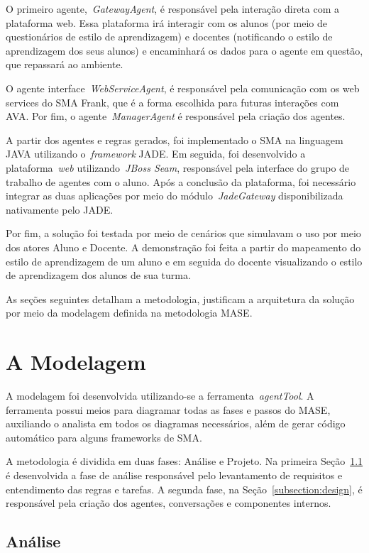 O primeiro agente,~\emph{GatewayAgent}, é responsável pela interação direta com a plataforma web. Essa plataforma irá interagir com os alunos (por meio de questionários de estilo de aprendizagem) e docentes (notificando o estilo de aprendizagem dos seus alunos) e encaminhará os dados para o agente em questão, que repassará ao ambiente.

O agente interface~\emph{WebServiceAgent}, é responsável pela comunicação com os web services do SMA Frank, que é a forma escolhida para futuras interações com AVA. Por fim, o agente~\emph{ManagerAgent} é responsável pela criação dos agentes.

A partir dos agentes e regras gerados, foi implementado o SMA na linguagem JAVA utilizando o~\emph{framework} JADE. Em seguida, foi desenvolvido a plataforma~\emph{web} utilizando~\emph{JBoss Seam}, responsável pela interface do grupo de trabalho de agentes com o aluno. Após a conclusão da plataforma, foi necessário integrar as duas aplicações por meio do módulo~\emph{JadeGateway} disponibilizada nativamente pelo JADE.

Por fim, a solução foi testada por meio de cenários que simulavam o uso por meio dos atores Aluno e Docente. A demonstração foi feita a partir do mapeamento do estilo de aprendizagem de um aluno e em seguida do docente visualizando o estilo de aprendizagem dos alunos de sua turma.

As seções seguintes detalham a metodologia, justificam a arquitetura da solução por meio da modelagem definida na metodologia MASE.

\section{A Modelagem}\label{section:modelagem}

A modelagem foi desenvolvida utilizando-se a ferramenta~\emph{agentTool}. A ferramenta possui meios para diagramar todas as fases e passos do MASE, auxiliando o analista em todos os diagramas necessários, além de gerar código automático para alguns frameworks de SMA.

A metodologia é dividida em duas fases: Análise e Projeto. Na primeira Seção~\ref{subsection:analise} é desenvolvida a fase de análise responsável pelo levantamento de requisitos e entendimento das regras e tarefas. A segunda fase, na Seção~\ref{subsection:design}, é responsável pela criação dos agentes, conversações e componentes internos.

\subsection{Análise}\label{subsection:analise}

